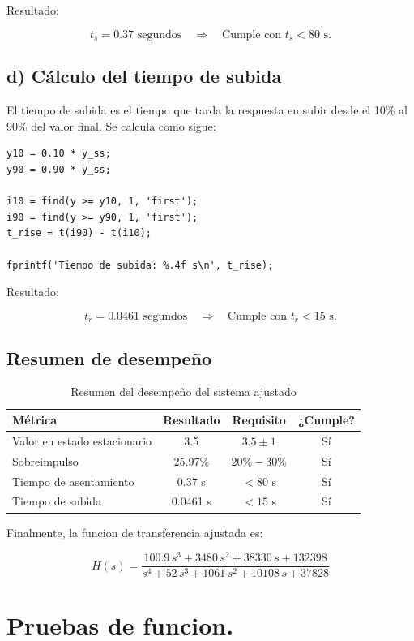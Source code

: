\documentclass[11pt,letterpaper]{article}
\begin{document}
Resultado:

\begin{equation}
t_s = 0.37 \text{ segundos} \quad \Rightarrow \quad \text{Cumple con } t_s < 80 \text{ s.}
\end{equation}

\vspace{1em}

\subsection*{d) Cálculo del tiempo de subida}

El tiempo de subida es el tiempo que tarda la respuesta en subir desde el 10\% al 90\% del valor final. Se calcula como sigue:

\begin{lstlisting}[caption={Cálculo del tiempo de subida}]
y10 = 0.10 * y_ss;
y90 = 0.90 * y_ss;

i10 = find(y >= y10, 1, 'first');
i90 = find(y >= y90, 1, 'first');
t_rise = t(i90) - t(i10);

fprintf('Tiempo de subida: %.4f s\n', t_rise);
\end{lstlisting}

Resultado:

\begin{equation}
t_r = 0.0461 \text{ segundos} \quad \Rightarrow \quad \text{Cumple con } t_r < 15 \text{ s.}
\end{equation}

\vspace{1em}

\subsection*{Resumen de desempeño}

\begin{table}[h]
\centering
\begin{tabular}{|l|c|c|c|}
\hline
\textbf{Métrica} & \textbf{Resultado} & \textbf{Requisito} & \textbf{¿Cumple?} \\
\hline
Valor en estado estacionario & 3.5       & $3.5 \pm 1$      & Sí \\
Sobreimpulso                 & 25.97\%   & $20\% - 30\%$    & Sí \\
Tiempo de asentamiento       & 0.37 s    & $< 80$ s         & Sí \\
Tiempo de subida             & 0.0461 s  & $< 15$ s         & Sí \\
\hline
\end{tabular}
\caption{Resumen del desempeño del sistema ajustado}
\end{table}

\newpage

Finalmente, la funcion de transferencia ajustada es:

\[
H(s) = \frac{100.9\,s^3 + 3480\,s^2 + 38330\,s + 132398}{s^4 + 52\,s^3 + 1061\,s^2 + 10108\,s + 37828}
\]

\section{Pruebas de funcion.}
\end{document}
